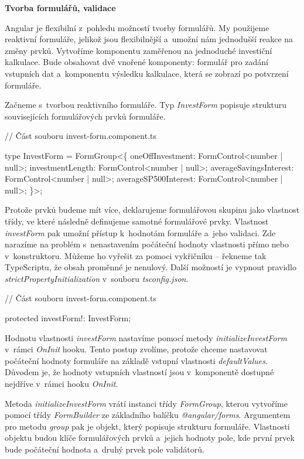 \begin{flushleft}
  \textbf{Tvorba formulářů, validace}
\end{flushleft}

Angular je flexibilní z~pohledu možností tvorby formulářů. My použijeme reaktivní formuláře, jelikož jsou flexibilnější a~umožní nám jednodušší reakce na změny prvků.
Vytvoříme komponentu zaměřenou na jednoduché investiční kalkulace. 
Bude obsahovat dvě vnořené komponenty: formulář pro zadání vstupních dat a~komponentu výsledku kalkulace, která se zobrazí po potvrzení formuláře.

Začneme s~tvorbou reaktivního formuláře. Typ \emph{InvestForm} popisuje strukturu souvisejících formulářových prvků formuláře.

\begin{prog}
// Část souboru invest-form.component.ts

type InvestForm = FormGroup<\{
  oneOffInvestment: FormControl<number | null>;
  investmentLength: FormControl<number | null>;
  averageSavingsInterest: FormControl<number | null>;
  averageSP500Interest: FormControl<number | null>;
\}>;
\end{prog}

Protože prvků budeme mít více, deklarujeme formulářovou skupinu jako vlastnost třídy, ve které následně definujeme samotné formulářové prvky. 
Vlastnost \emph{investForm} pak umožní přístup k~hodnotám formuláře a~jeho validaci. Zde narazíme na problém s~nenastavením počáteční hodnoty vlastnosti přímo nebo v~konstruktoru. 
Můžeme ho vyřešit za pomoci vykřičníku -- řekneme tak TypeScriptu, že obsah proměnné je nenulový. Další možností je vypnout pravidlo \emph{strictPropertyInitialization} v~souboru \emph{tsconfig.json}.

\begin{prog}
// Část souboru invest-form.component.ts

protected investForm!: InvestForm;
\end{prog}

Hodnotu vlastnosti \emph{investForm} nastavíme pomocí metody \emph{initializeInvestForm} v~rámci \emph{OnInit} hooku. 
Tento postup zvolíme, protože chceme nastavovat počáteční hodnoty formuláře na základě vstupní vlastnosti \emph{defaultValues}.
Důvodem je, že hodnoty vstupních vlastností jsou v~komponentě dostupné nejdříve v~rámci hooku \emph{OnInit}.

Metoda \emph{initializeInvestForm} vrátí instanci třídy \emph{FormGroup}, kterou vytvoříme pomocí třídy \emph{FormBuilder} ze základního balíčku \emph{@angular/forms}. 
Argumentem pro metodu \emph{group} pak je objekt, který popisuje strukturu formuláře. 
Vlastnosti objektu budou klíče formulářových prvků a~jejich hodnoty pole, kde první prvek bude počáteční hodnota a~druhý prvek pole validátorů.

